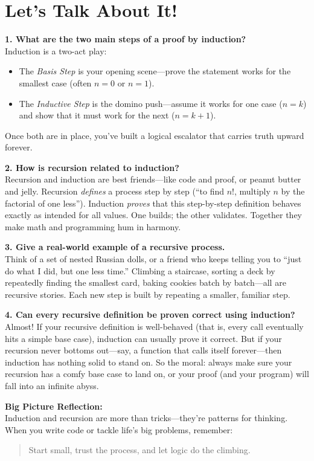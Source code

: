 \newpage

\section*{Let’s Talk About It!}

\textbf{1. What are the two main steps of a proof by induction?}\\
Induction is a two-act play:
\begin{itemize}
  \item The \emph{Basis Step} is your opening scene—prove the statement works for the smallest case (often $n=0$ or $n=1$).  
  \item The \emph{Inductive Step} is the domino push—assume it works for one case ($n=k$) and show that it must work for the next ($n=k+1$).  
\end{itemize}
Once both are in place, you’ve built a logical escalator that carries truth upward forever.  

\vspace{1em}

\textbf{2. How is recursion related to induction?}\\
Recursion and induction are best friends—like code and proof, or peanut butter and jelly.  
Recursion \emph{defines} a process step by step (“to find $n!$, multiply $n$ by the factorial of one less”).  
Induction \emph{proves} that this step-by-step definition behaves exactly as intended for all values.  
One builds; the other validates. Together they make math and programming hum in harmony.

\vspace{1em}

\textbf{3. Give a real-world example of a recursive process.}\\
Think of a set of nested Russian dolls, or a friend who keeps telling you to “just do what I did, but one less time.”  
Climbing a staircase, sorting a deck by repeatedly finding the smallest card, baking cookies batch by batch—all are recursive stories.  
Each new step is built by repeating a smaller, familiar step.

\vspace{1em}

\textbf{4. Can every recursive definition be proven correct using induction?}\\
Almost! If your recursive definition is well-behaved (that is, every call eventually hits a simple base case), induction can usually prove it correct.  
But if your recursion never bottoms out—say, a function that calls itself forever—then induction has nothing solid to stand on.  
So the moral: always make sure your recursion has a comfy base case to land on, or your proof (and your program) will fall into an infinite abyss.

\vspace{1em}

\textbf{Big Picture Reflection:}\\
Induction and recursion are more than tricks—they’re patterns for thinking.  
When you write code or tackle life’s big problems, remember:  
\begin{quote}
Start small, trust the process, and let logic do the climbing.
\end{quote}

